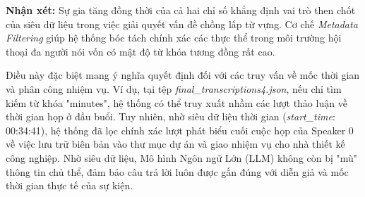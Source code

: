 \textbf{Nhận xét:}
Sự gia tăng đồng thời của cả hai chỉ số khẳng định vai trò then chốt của siêu dữ liệu trong việc giải quyết vấn đề chồng lấp từ vựng. Cơ chế \textit{Metadata Filtering} giúp hệ thống bóc tách chính xác các thực thể trong môi trường hội thoại đa người nói vốn có mật độ từ khóa tương đồng rất cao. 

Điều này đặc biệt mang ý nghĩa quyết định đối với các truy vấn về mốc thời gian và phân công nhiệm vụ. Ví dụ, tại tệp \textit{final\_transcriptions4.json}, nếu chỉ tìm kiếm từ khóa "minutes", hệ thống có thể truy xuất nhầm các lượt thảo luận về thời gian họp ở đầu buổi. Tuy nhiên, nhờ siêu dữ liệu thời gian (\textit{start\_time}: 00:34:41), hệ thống đã lọc chính xác lượt phát biểu cuối cuộc họp của Speaker 0 về việc lưu trữ biên bản vào thư mục dự án và giao nhiệm vụ cho nhà thiết kế công nghiệp. Nhờ siêu dữ liệu, Mô hình Ngôn ngữ Lớn (LLM) không còn bị "mù" thông tin chủ thể, đảm bảo câu trả lời luôn được gắn đúng với diễn giả và mốc thời gian thực tế của sự kiện.